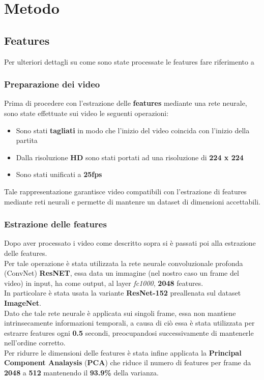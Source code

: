 \chapter{Metodo}\label{ch:chapter1}
\section{Features}
Per ulteriori dettagli su come sono state processate le features fare riferimento a \citep{soccerNet}
\subsection{Preparazione dei video }
Prima di procedere con l'estrazione delle \textbf{features} mediante una rete neurale, sono state effettuate sui video le seguenti operazioni:
\begin{itemize}
\item Sono stati \textbf{tagliati} in modo che l'inizio del video coincida con l'inizio della partita
\item Dalla risoluzione \textbf{HD} sono stati portati ad una risoluzione di \textbf{224 x 224}
\item Sono stati unificati a \textbf{25fps}
\end{itemize}
Tale rappresentazione garantisce video compatibili con l'estrazione di features mediante reti neurali e permette di mantenre un dataset di dimensioni accettabili.
\subsection{Estrazione delle features}
Dopo aver processato i video come descritto sopra si è passati poi alla estrazione delle features.
\\Per tale operazione è stata utilizzata la rete neurale convoluzionale profonda (ConvNet) \textbf{ResNET}, essa data un immagine (nel nostro caso un frame del video) in input, ha come output, al layer \textit{fc1000}, \textbf{2048} features.
\\In particolare è stata usata la variante \textbf{ResNet-152} preallenata sul dataset \textbf{ImageNet}.
\\Dato che tale rete neurale è applicata sui singoli frame, essa non mantiene intrinsecamente informazioni temporali, a causa di ciò essa è stata utilizzata per estrarre features ogni \textbf{0.5} secondi, preocupandosi successivamente di mantenerle nell'ordine corretto.
\\Per ridurre le dimensioni delle features è stata infine applicata la \textbf{Principal Component Analaysis} (\textbf{PCA}) che riduce il numero di features per frame da \textbf{2048} a \textbf{512} mantenendo il \textbf{93.9\%} della varianza.

